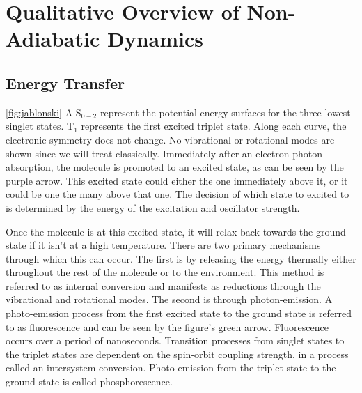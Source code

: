 \section{Qualitative Overview of Non-Adiabatic Dynamics}

\subsection{Energy Transfer}

\noindent
	  \begin{multiFigure} 
	    \label{fig:jablonski}
	  \end{multiFigure}
\bigskip

 \ref{fig:jablonski} A 
S\(_{0-2}\) represent the potential energy surfaces for the three lowest singlet states.
T\(_1\) represents the first excited triplet state.
Along each curve, the electronic symmetry does not change.
No vibrational or rotational modes are shown since we will treat  classically.
Immediately after an electron photon absorption, the molecule is promoted to an excited state, as can be seen by the purple arrow.
This excited state could either the one immediately above it, or it could be one the many above that one.
The decision of which state to excited to is determined by the energy of the excitation and oscillator strength.

Once the molecule is at this excited-state, it will relax back towards the ground-state if it isn't at a high temperature.
There are two primary mechanisms through which this can occur.
The first is by releasing the energy thermally either throughout the rest of the molecule or to the environment. This method is referred to as internal conversion and manifests as reductions through the vibrational and rotational modes.
The second is through photon-emission.
A photo-emission process from the first excited state to the ground state is referred to as fluorescence and can be seen by the figure's green arrow.
Fluorescence occurs over a period of nanoseconds.
Transition processes from singlet states to the triplet states are  dependent on the spin-orbit coupling strength, in a process called an intersystem conversion.
Photo-emission from the triplet state to the ground state is called phosphorescence.


